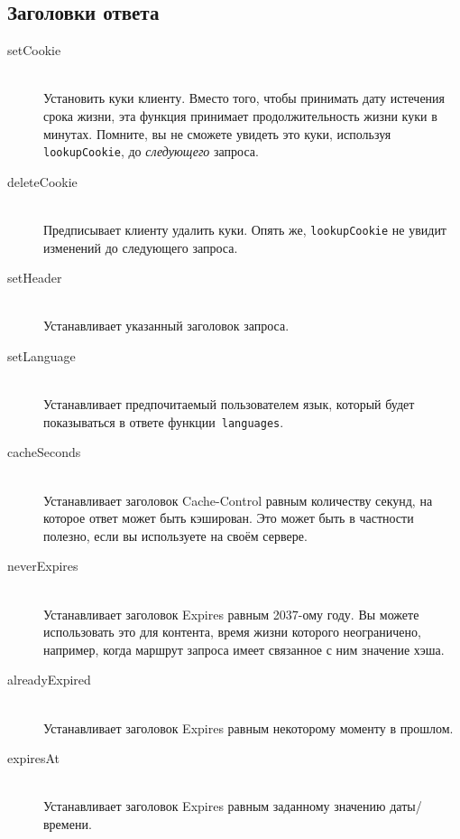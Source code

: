 \subsection{Заголовки ответа}
\begin{description}
\item[setCookie] \hfill \\
Установить куки клиенту. Вместо того, чтобы принимать дату истечения
срока жизни, эта функция принимает продолжительность жизни куки в
минутах. Помните, вы не сможете увидеть это куки, используя
\lstinline!lookupCookie!, до \emph{следующего} запроса.

\item[deleteCookie] \hfill \\
Предписывает клиенту удалить куки. Опять же, \lstinline!lookupCookie! не
увидит изменений до следующего запроса.

\item[setHeader] \hfill \\
Устанавливает указанный заголовок запроса.

\item[setLanguage] \hfill \\
Устанавливает предпочитаемый пользователем язык, который будет
показываться в ответе функции~\lstinline!languages!.

\item[cacheSeconds] \hfill \\
  Устанавливает заголовок Cache-Control равным количеству секунд, на которое
  ответ может быть кэширован. Это может быть в частности полезно, если вы используете
   на своём сервере.

\item[neverExpires] \hfill \\
  Устанавливает заголовок Expires равным 2037-ому году. Вы можете использовать
  это для контента, время жизни которого неограничено, например, когда маршрут запроса
  имеет связанное с ним значение хэша.

\item[alreadyExpired] \hfill \\
Устанавливает заголовок Expires равным некоторому моменту в прошлом.

\item[expiresAt] \hfill \\
Устанавливает заголовок Expires равным заданному значению даты/времени.
\end{description}

